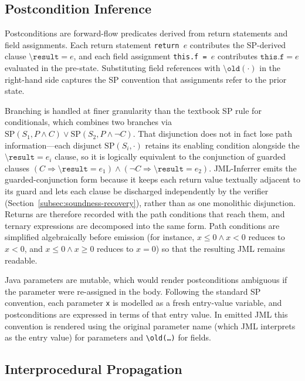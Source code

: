 \subsection{Postcondition Inference}
\label{subsec:sp-mapping}

Postconditions are forward-flow predicates derived from return statements and field assignments. Each return statement \texttt{return $e$} contributes the SP-derived clause $\texttt{\textbackslash result} = e$, and each field assignment \texttt{this.f = $e$} contributes $\texttt{this.f} = e$ evaluated in the pre-state. Substituting field references with $\texttt{\textbackslash old}(\cdot)$ in the right-hand side captures the SP convention that assignments refer to the prior state.

Branching is handled at finer granularity than the textbook SP rule for conditionals, which combines two branches via $\text{SP}(S_1, P \land C) \lor \text{SP}(S_2, P \land \neg C)$. That disjunction does not in fact lose path information---each disjunct $\text{SP}(S_i, \cdot)$ retains its enabling condition alongside the $\texttt{\textbackslash result} = e_i$ clause, so it is logically equivalent to the conjunction of guarded clauses $(C \Rightarrow \texttt{\textbackslash result} = e_1) \land (\neg C \Rightarrow \texttt{\textbackslash result} = e_2)$. JML-Inferrer emits the guarded-conjunction form because it keeps each return value textually adjacent to its guard and lets each clause be discharged independently by the verifier (Section~\ref{subsec:soundness-recovery}), rather than as one monolithic disjunction. Returns are therefore recorded with the path conditions that reach them, and ternary expressions are decomposed into the same form. Path conditions are simplified algebraically before emission (for instance, $x \le 0 \land x < 0$ reduces to $x < 0$, and $x \le 0 \land x \ge 0$ reduces to $x = 0$) so that the resulting JML remains readable.

Java parameters are mutable, which would render postconditions ambiguous if the parameter were re-assigned in the body. Following the standard SP convention, each parameter \texttt{x} is modelled as a fresh entry-value variable, and postconditions are expressed in terms of that entry value. In emitted JML this convention is rendered using the original parameter name (which JML interprets as the entry value) for parameters and \texttt{\textbackslash old(\dots)} for fields.

\subsection{Interprocedural Propagation}
\label{subsec:proc-summaries}

